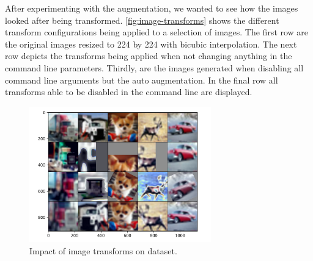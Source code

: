 \documentclass{article}
\begin{document}
    After experimenting with the augmentation, we wanted to see how the images looked after being transformed.
    \autoref{fig:image-transforms} shows the different transform configurations being applied to a selection of images.
    The first row are the original images resized to 224 by 224 with bicubic interpolation.
    The next row depicts the transforms being applied when not changing anything in the command line parameters.
    Thirdly, are the images generated when disabling all command line arguments but the auto augmentation.
    In the final row all transforms able to be disabled in the command line are displayed.
    \begin{figure}[h]
        \centering
        \includegraphics[width=0.7\textwidth]{images/image_transforms}
        \caption{Impact of image transforms on dataset.}
        \label{fig:image-transforms}
    \end{figure}
\end{document}
